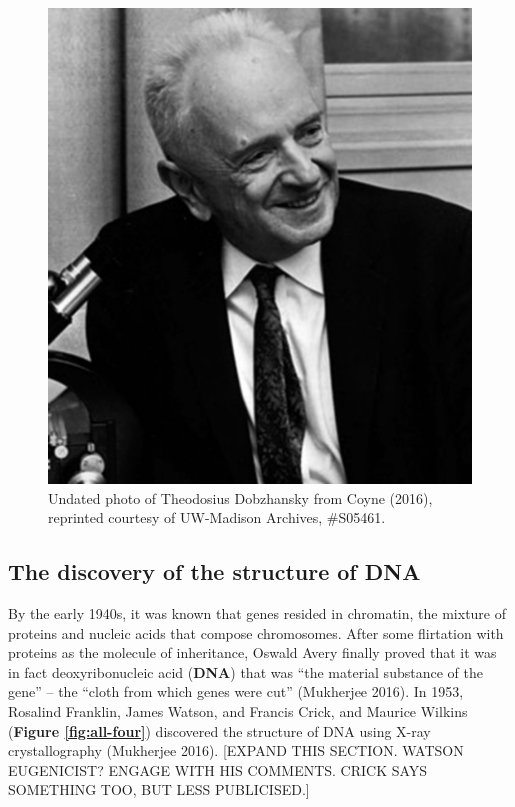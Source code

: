 \documentclass[
]{book}
\begin{document}
\begin{figure}

\includegraphics[width=1\linewidth]{figs/introduction/Dobzhansky} \hfill{}

\caption{Undated photo of Theodosius Dobzhansky from Coyne (2016), reprinted courtesy of UW-Madison Archives, \#S05461.}\label{fig:dobzhansky}
\end{figure}

\hypertarget{the-discovery-of-the-structure-of-dna}{%
\subsection{The discovery of the structure of DNA}\label{the-discovery-of-the-structure-of-dna}}

By the early 1940s, it was known that genes resided in chromatin, the mixture of proteins and nucleic acids that compose chromosomes. After some flirtation with proteins as the molecule of inheritance, Oswald Avery finally proved that it was in fact deoxyribonucleic acid (\textbf{DNA}) that was ``the material substance of the gene'' -- the ``cloth from which genes were cut'' (Mukherjee 2016). In 1953, Rosalind Franklin, James Watson, and Francis Crick, and Maurice Wilkins (\textbf{Figure \ref{fig:all-four}}) discovered the structure of DNA using X-ray crystallography (Mukherjee 2016). {[}EXPAND THIS SECTION. WATSON EUGENICIST? ENGAGE WITH HIS COMMENTS. CRICK SAYS SOMETHING TOO, BUT LESS PUBLICISED.{]}
\end{document}
